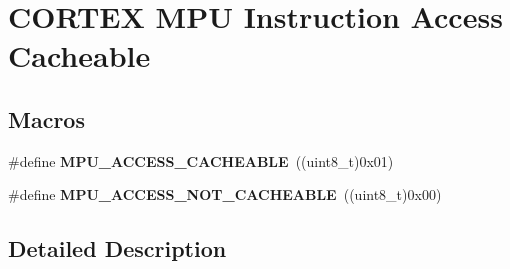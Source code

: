 \hypertarget{group___c_o_r_t_e_x___m_p_u___access___cacheable}{}\section{C\+O\+R\+T\+EX M\+PU Instruction Access Cacheable}
\label{group___c_o_r_t_e_x___m_p_u___access___cacheable}
\subsection*{Macros}
\begin{DoxyCompactItemize}
\item 
\#define {\bfseries M\+P\+U\+\_\+\+A\+C\+C\+E\+S\+S\+\_\+\+C\+A\+C\+H\+E\+A\+B\+LE}~((uint8\+\_\+t)0x01)\hypertarget{group___c_o_r_t_e_x___m_p_u___access___cacheable_ga396b3d67e7a63731cf50ed279c246097}{}\label{group___c_o_r_t_e_x___m_p_u___access___cacheable_ga396b3d67e7a63731cf50ed279c246097}

\item 
\#define {\bfseries M\+P\+U\+\_\+\+A\+C\+C\+E\+S\+S\+\_\+\+N\+O\+T\+\_\+\+C\+A\+C\+H\+E\+A\+B\+LE}~((uint8\+\_\+t)0x00)\hypertarget{group___c_o_r_t_e_x___m_p_u___access___cacheable_gadfbbfaf4a8c0850372f766dda0a80d86}{}\label{group___c_o_r_t_e_x___m_p_u___access___cacheable_gadfbbfaf4a8c0850372f766dda0a80d86}

\end{DoxyCompactItemize}


\subsection{Detailed Description}
